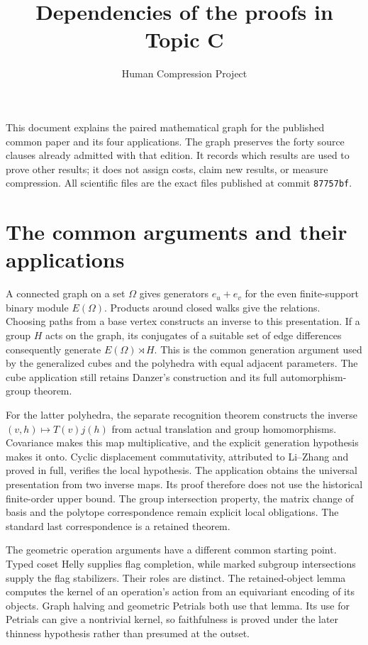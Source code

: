 \documentclass[a4paper,11pt]{article}
\title{Dependencies of the proofs in Topic C}
\author{Human Compression Project}
\date{}
\begin{document}
\maketitle
\noindent
This document explains the paired mathematical graph for the published common
paper and its four applications. The graph preserves the forty source clauses
already admitted with that edition. It records which results are used to prove
other results; it does not assign costs, claim new results, or measure compression.
All scientific files are the exact files published at commit \texttt{87757bf}.

\section{The common arguments and their applications}
A connected graph on a set $\Omega$ gives generators $e_u+e_v$ for the even
finite-support binary module $E(\Omega)$. Products around closed walks give the
relations. Choosing paths from a base vertex constructs an inverse to this
presentation. If a group $H$ acts on the graph, its conjugates of a suitable set
of edge differences consequently generate $E(\Omega)\rtimes H$.
This is the common generation argument used by the generalized cubes and the
polyhedra with equal adjacent parameters. The cube application still retains
Danzer's construction and its full automorphism-group theorem.

For the latter polyhedra, the separate recognition theorem constructs the inverse
$(v,h)\mapsto T(v)j(h)$ from actual translation and group homomorphisms.
Covariance makes this map multiplicative, and the explicit generation hypothesis
makes it onto. Cyclic displacement commutativity, attributed to Li--Zhang and
proved in full, verifies the local hypothesis. The application obtains the
universal presentation from two inverse maps. Its proof therefore does not use
the historical finite-order upper bound. The group intersection property, the
matrix change of basis and the polytope correspondence remain explicit local
obligations. The standard last correspondence is a retained theorem.

The geometric operation arguments have a different common starting point.
Typed coset Helly supplies flag completion, while marked subgroup intersections
supply the flag stabilizers. Their roles are distinct. The retained-object
lemma computes the kernel of an operation's action from an equivariant encoding
of its objects. Graph halving and geometric Petrials both use that lemma.
Its use for Petrials can give a nontrivial kernel, so faithfulness is proved
under the later thinness hypothesis rather than presumed at the outset.
\end{document}
